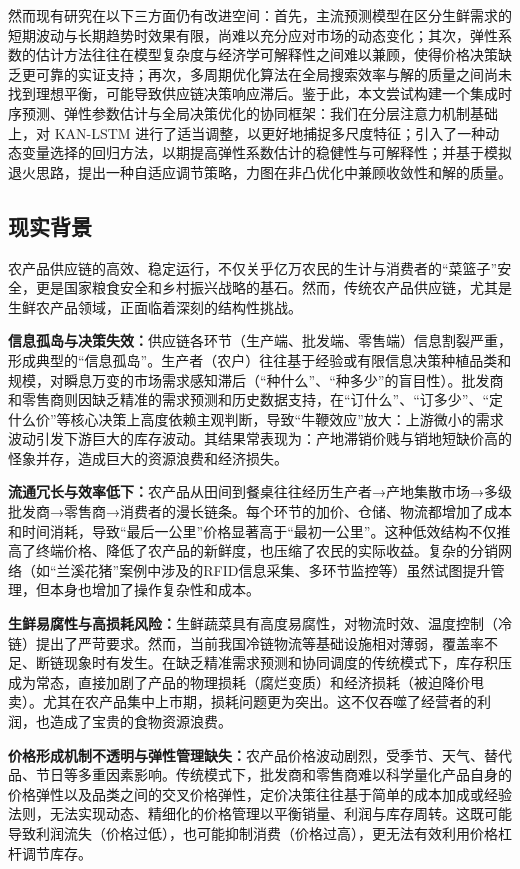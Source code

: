 \documentclass[lang=cn,12pt,a4paper]{elegantpaper}
\begin{document}
然而现有研究在以下三方面仍有改进空间：首先，主流预测模型在区分生鲜需求的短期波动与长期趋势时效果有限，尚难以充分应对市场的动态变化；其次，弹性系数的估计方法往往在模型复杂度与经济学可解释性之间难以兼顾，使得价格决策缺乏更可靠的实证支持；再次，多周期优化算法在全局搜索效率与解的质量之间尚未找到理想平衡，可能导致供应链决策响应滞后。鉴于此，本文尝试构建一个集成时序预测、弹性参数估计与全局决策优化的协同框架：我们在分层注意力机制基础上，对 KAN-LSTM 进行了适当调整，以更好地捕捉多尺度特征；引入了一种动态变量选择的回归方法，以期提高弹性系数估计的稳健性与可解释性；并基于模拟退火思路，提出一种自适应调节策略，力图在非凸优化中兼顾收敛性和解的质量。
\subsection{现实背景}
\label{subsec:real_background}
农产品供应链的高效、稳定运行，不仅关乎亿万农民的生计与消费者的“菜篮子”安全，更是国家粮食安全和乡村振兴战略的基石。然而，传统农产品供应链，尤其是生鲜农产品领域，正面临着深刻的结构性挑战。

\textbf{信息孤岛与决策失效：}供应链各环节（生产端、批发端、零售端）信息割裂严重，形成典型的“信息孤岛”。生产者（农户）往往基于经验或有限信息决策种植品类和规模，对瞬息万变的市场需求感知滞后（“种什么”、“种多少”的盲目性）。批发商和零售商则因缺乏精准的需求预测和历史数据支持，在“订什么”、“订多少”、“定什么价”等核心决策上高度依赖主观判断，导致“牛鞭效应”放大：上游微小的需求波动引发下游巨大的库存波动。其结果常表现为：产地滞销价贱与销地短缺价高的怪象并存，造成巨大的资源浪费和经济损失。

\textbf{流通冗长与效率低下：}农产品从田间到餐桌往往经历生产者→产地集散市场→多级批发商→零售商→消费者的漫长链条。每个环节的加价、仓储、物流都增加了成本和时间消耗，导致“最后一公里”价格显著高于“最初一公里”。这种低效结构不仅推高了终端价格、降低了农产品的新鲜度，也压缩了农民的实际收益。复杂的分销网络（如“兰溪花猪”案例中涉及的RFID信息采集、多环节监控等）虽然试图提升管理，但本身也增加了操作复杂性和成本。

\textbf{生鲜易腐性与高损耗风险：}生鲜蔬菜具有高度易腐性，对物流时效、温度控制（冷链）提出了严苛要求。然而，当前我国冷链物流等基础设施相对薄弱，覆盖率不足、断链现象时有发生。在缺乏精准需求预测和协同调度的传统模式下，库存积压成为常态，直接加剧了产品的物理损耗（腐烂变质）和经济损耗（被迫降价甩卖）。尤其在农产品集中上市期，损耗问题更为突出。这不仅吞噬了经营者的利润，也造成了宝贵的食物资源浪费。

\textbf{价格形成机制不透明与弹性管理缺失：}农产品价格波动剧烈，受季节、天气、替代品、节日等多重因素影响。传统模式下，批发商和零售商难以科学量化产品自身的价格弹性以及品类之间的交叉价格弹性，定价决策往往基于简单的成本加成或经验法则，无法实现动态、精细化的价格管理以平衡销量、利润与库存周转。这既可能导致利润流失（价格过低），也可能抑制消费（价格过高），更无法有效利用价格杠杆调节库存。
\end{document}
